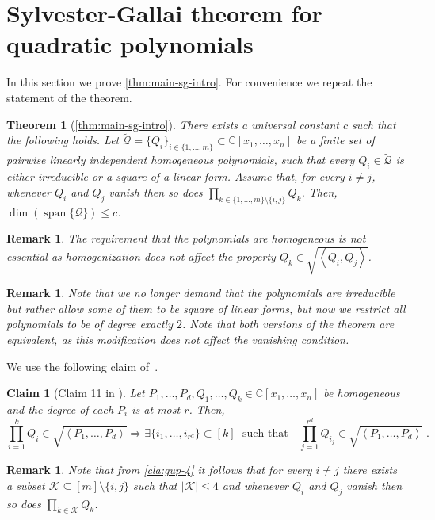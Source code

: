 \documentclass[10pt,a4paper]{article}
\newtheorem{claim}[theorem]{Claim}
\newtheorem{remark}[theorem]{Remark}
\newtheorem*{theorem*}{Theorem}
\renewcommand{\C}{\mathbb{C}}
\newcommand{\cK}{{\mathcal{K}}}
\newcommand{\cQ}{{\mathcal{Q}}}
\newcommand{\ideal}[1]{\left \langle{#1}\right \rangle}
\newcommand{\MVar}[2]{{#1}_1,\ldots, {#1}_{#2}}
\newcommand{\PRing}[3]{\mathbb{#1}[ \MVar{#2}{#3}]}
\newcommand{\CRing}[2]{\PRing{C}{#1}{#2}}
\newcommand{\spn}[1]{\operatorname{span}\{{#1}\}}
\begin{document}
\section{Sylvester-Gallai theorem for quadratic polynomials}\label{sec:quad-SG}

In this section we prove \autoref{thm:main-sg-intro}. For convenience we repeat the statement of the theorem.








\begin{theorem*}[\autoref{thm:main-sg-intro}]
There exists a universal constant $c$ such that the following holds. 
Let $\tilde{\cQ} = \{Q_i\}_{i\in \{1,\ldots,m\}}\subset\C[x_1,\ldots,x_n]$ be a finite set of pairwise linearly independent homogeneous polynomials, such that every $Q_i\in \tilde{\cQ}$ is either irreducible or a square of a linear form. Assume  that, for every $i\neq j$, whenever $Q_i$ and $Q_j$ vanish then so does $\prod_{k\in  \{1,\ldots,m\} \setminus\{i,j\}} Q_k$. Then,  $\dim(\spn{\cQ})\leq c$.
\end{theorem*}





\begin{remark}
The requirement that the polynomials are homogeneous is not essential as homogenization does not affect the property $Q_k\in\sqrt{\ideal{Q_i,Q_j}}$. 
\end{remark}

\begin{remark}
Note that we no longer demand that the polynomials are irreducible but rather allow some of them to be square of linear forms, but now we restrict all polynomials to be of degree exactly $2$. Note that both versions of the theorem are equivalent, as this modification does not affect the vanishing condition. 
\end{remark}

We use the following claim of~\cite{Gupta14}.
\begin{claim}[Claim 11 in \cite{Gupta14}]\label{cla:gup-4}
Let $\MVar{P}{d},\MVar{Q}{k}\in \CRing{x}{n}$ be homogeneous and the degree of each $P_i$ is at most $r$. Then,
\begin{equation*}
\prod_{i=1}^k Q_i \in \sqrt{\ideal{\MVar{P}{d}}} \Rightarrow \exists \lbrace \MVar{i}{r^d} \rbrace \subset [k] \; \text{ such that} \quad  \prod_{j=1}^{r^d} Q_{i_j} \in \sqrt{\ideal{\MVar{P}{d}}} \;.
\end{equation*}
\end{claim}
\begin{remark}\label{rem:K=4}
Note that from \autoref{cla:gup-4} it follows that for every $i\neq j$ there exists a subset $\cK \subseteq [m]\setminus\{i,j\}$ such that $|\cK|\leq 4$ and whenever $Q_i$ and $Q_j$ vanish then so does $\prod_{k\in \cK} Q_k$.
\end{remark}
\end{document}
